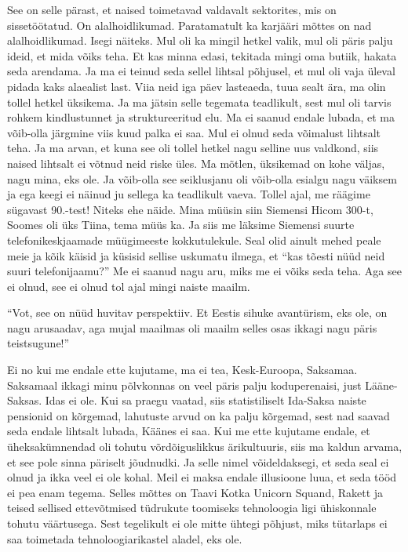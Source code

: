 See on selle pärast, et naised toimetavad valdavalt sektorites, mis on 
sissetöötatud. On alalhoidlikumad. Paratamatult ka karjääri mõttes on nad  
alalhoidlikumad. Isegi näiteks. Mul oli ka mingil hetkel valik, mul oli päris 
palju ideid, et mida võiks teha. Et kas minna edasi, tekitada mingi oma butiik, 
hakata seda arendama. Ja ma ei teinud seda sellel lihtsal põhjusel, et mul oli 
vaja üleval pidada kaks alaealist last. Viia neid iga päev lasteaeda, tuua 
sealt ära, ma olin tollel hetkel üksikema. Ja ma jätsin selle tegemata 
teadlikult, sest mul oli tarvis rohkem kindlustunnet ja struktureeritud elu. Ma 
ei saanud endale lubada, et ma võib-olla järgmine viis kuud palka ei saa. Mul 
ei olnud seda võimalust lihtsalt teha. Ja ma arvan, et kuna see oli tollel 
hetkel nagu selline uus valdkond, siis naised lihtsalt ei võtnud neid riske 
üles. Ma mõtlen, üksikemad on kohe väljas, nagu mina, eks ole. Ja võib-olla see 
seiklusjanu oli võib-olla esialgu nagu väiksem ja ega keegi ei näinud ju 
sellega ka teadlikult vaeva. Tollel ajal, me räägime sügavast 90.-test! Niteks 
ehe näide. Mina müüsin siin Siemensi Hicom 300-t, Soomes oli üks Tiina, tema müüs ka. Ja siis me läksime 
Siemensi suurte telefonikeskjaamade müügimeeste kokkutulekule. Seal olid ainult 
mehed peale meie ja kõik käisid ja küsisid sellise uskumatu ilmega, et 
\enquote{kas tõesti nüüd neid suuri telefonijaamu?} Me ei saanud nagu aru, miks 
me ei võiks seda teha. Aga see ei olnud, see ei olnud tol ajal mingi naiste 
maailm. 

\enquote{Vot, see on nüüd huvitav perspektiiv. Et  Eestis sihuke avantürism, 
eks ole, on nagu arusaadav, aga mujal maailmas oli maailm selles osas ikkagi 
nagu päris teistsugune!}

Ei no kui me endale ette kujutame, ma ei tea, Kesk-Euroopa, Saksamaa. Saksamaal 
ikkagi minu põlvkonnas on veel päris palju koduperenaisi, just Lääne-Saksas. 
Idas ei ole. Kui sa praegu vaatad, siis statistiliselt Ida-Saksa naiste 
pensionid on kõrgemad,  lahutuste arvud on ka palju kõrgemad, sest nad saavad 
seda endale lihtsalt lubada, Käänes ei saa. Kui me ette kujutame endale, et 
üheksakümnendad oli tohutu võrdõiguslikkus ärikultuuris, siis ma kaldun arvama, 
et see pole sinna päriselt jõudnudki. Ja selle nimel võideldaksegi, et seda 
seal ei olnud ja ikka veel ei ole kohal. Meil ei maksa endale illusioone luua, 
et seda tööd ei pea enam tegema. Selles mõttes on Taavi Kotka Unicorn Squand, Rakett ja teised sellised ettevõtmised tüdrukute 
toomiseks tehnoloogia ligi ühiskonnale tohutu väärtusega. Sest tegelikult ei 
ole mitte ühtegi põhjust, miks tütarlaps ei saa toimetada tehnoloogiarikastel 
aladel, eks ole.

